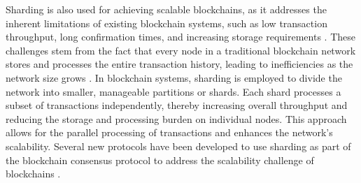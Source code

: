 \noindent Sharding is also used for achieving scalable blockchains, as it addresses the inherent limitations of existing blockchain systems, such as low transaction throughput, long confirmation times, and increasing storage requirements \cite{croman2016scaling}. These challenges stem from the fact that every node in a traditional blockchain network stores and processes the entire transaction history, leading to inefficiencies as the network size grows \cite{zamani2018rapidchain}. In blockchain systems, sharding is employed to divide the network into smaller, manageable partitions or shards. Each shard processes a subset of transactions independently, thereby increasing overall throughput and reducing the storage and processing burden on individual nodes. This approach allows for the parallel processing of transactions and enhances the network's scalability. Several new protocols have been developed to use sharding as part of the blockchain consensus protocol to address the scalability challenge of blockchains \cite{sonnino2018chainspace, kokoris2018omniledger, zamani2018rapidchain}.





